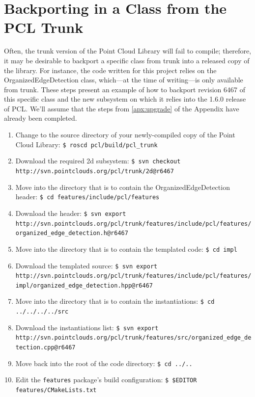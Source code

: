 \documentclass[12pt]{report}
\begin{document}
\section{Backporting in a Class from the PCL Trunk}
Often, the trunk version of the Point Cloud Library will fail to compile; therefore, it may be desirable to backport a specific class from trunk into a released copy of the library.  For instance, the code written for this project relies on the OrganizedEdgeDetection class, which---at the time of writing---is only available from trunk.  These steps present an example of how to backport revision 6467 of this specific class and the new subsystem on which it relies into the 1.6.0 release of PCL.  We'll assume that the steps from \autoref{apx:upgrade} of the Appendix have already been completed.
\begin{sloppypar}
\begin{enumerate}
\item{Change to the source directory of your newly-compiled copy of the Point Cloud Library: \texttt{\$\ roscd pcl/build/pcl\_trunk}}
\item{Download the required 2d subsystem: \texttt{\$\ svn checkout http://svn.pointclouds.org/pcl/trunk/2d@r6467}}
\item{Move into the directory that is to contain the OrganizedEdgeDetection header: \texttt{\$\ cd features/include/pcl/features}}
\item{Download the header: \texttt{\$\ svn export http:\slash\slash svn.pointclouds.org\slash pcl\slash trunk\slash features\slash include\slash pcl\slash features\slash organized\_edge\_detection.h@r6467}}
\item{Move into the directory that is to contain the templated code: \texttt{\$\ cd impl}}
\item{Download the templated source: \texttt{\$\ svn export http:\slash\slash svn.pointclouds.org\slash pcl\slash trunk\slash features\slash include\slash pcl\slash features\slash impl\slash organized\_edge\_detection.hpp@r6467}}
\item{Move into the directory that is to contain the instantiations: \texttt{\$\ cd ../../../../src}}
\item{Download the instantiations list: \texttt{\$\ svn export http:\slash\slash svn.pointclouds.org\slash pcl\slash trunk\slash features\slash src\slash organized\_edge\_detection.cpp@r6467}}
\item{Move back into the root of the code directory: \texttt{\$\ cd ../..}}
\item{Edit the \texttt{features} package's build configuration: \texttt{\$\ \$EDITOR features/CMakeLists.txt}}

\end{enumerate}
\end{sloppypar}
\end{document}
